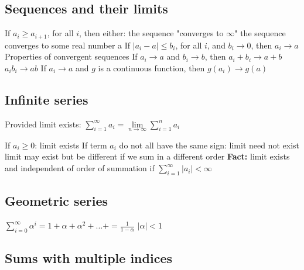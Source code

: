 {{{{%
\subsection{Sequences and their limits}

\begin{outline}
 \1 If $a_i \geq a_{i+1}$, for all $i$, then either:
   \2 the sequence "converges to $\infty$"
   \2 the sequence converges to some real number a
 \1 If $|a_i - a| \leq b_i$, for all $i$, and $b_i \rightarrow 0$, then $a_i \rightarrow a$
 \1 Properties of convergent sequences
   \2 If $a_i \rightarrow a$ and $b_i \rightarrow b$, then
     \3 $a_i + b_i \rightarrow a + b$
     \3 $a_i b_i \rightarrow a b$
   \2 If $a_i \rightarrow a$ and $g$ is a continuous function, then
     \3 $g(a_i) \rightarrow g(a)$
\end{outline}

\subsection{Infinite series}

Provided limit exists: $\sum\limits_{i=1}^{\infty}a_i = \lim\limits_{n \rightarrow \infty} \sum\limits_{i=1}^{n} a_i$

\begin{outline}
\1 If $a_i \geq 0$: limit exists
\1 If term $a_i$ do not all have the same sign:
  \2 limit need not exist
  \2 limit may exist but be different if we sum in a different order
  \2 \textbf{Fact:} limit exists and independent of order of summation if $\sum\limits_{i=1}^{\infty} |a_i| < \infty$
\end{outline}

\subsection{Geometric series}

$\sum\limits_{i=0}^{\infty}\alpha^i = 1 + \alpha + \alpha^2 + ... + = \frac{1}{1-\alpha}$ $|\alpha| < 1$

\subsection{Sums with multiple indices}

}}}}
